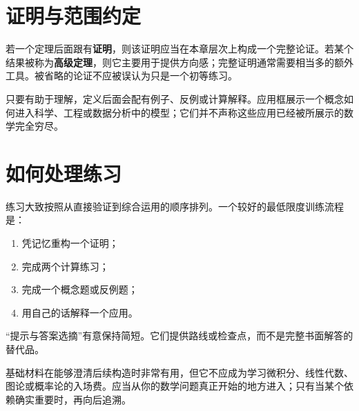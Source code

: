\section*{证明与范围约定}

若一个定理后面跟有\textbf{证明}，则该证明应当在本章层次上构成一个完整论证。若某个结果被称为\textbf{高级定理}，则它主要用于提供方向感；完整证明通常需要相当多的额外工具。被省略的论证不应被误认为只是一个初等练习。

只要有助于理解，定义后面会配有例子、反例或计算解释。应用框展示一个概念如何进入科学、工程或数据分析中的模型；它们并不声称这些应用已经被所展示的数学完全穷尽。

\section*{如何处理练习}

练习大致按照从直接验证到综合运用的顺序排列。一个较好的最低限度训练流程是：
\begin{enumerate}
    \item 凭记忆重构一个证明；
    \item 完成两个计算练习；
    \item 完成一个概念题或反例题；
    \item 用自己的话解释一个应用。
\end{enumerate}
“提示与答案选摘”有意保持简短。它们提供路线或检查点，而不是完整书面解答的替代品。

\begin{mynote}
基础材料在能够澄清后续构造时非常有用，但它不应成为学习微积分、线性代数、图论或概率论的入场费。应当从你的数学问题真正开始的地方进入；只有当某个依赖确实重要时，再向后追溯。
\end{mynote}
